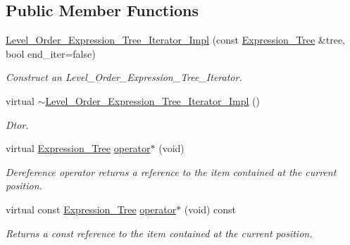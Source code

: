\subsection*{Public Member Functions}
\begin{DoxyCompactItemize}
\item 
\hyperlink{classMadara_1_1Expression__Tree_1_1Level__Order__Expression__Tree__Iterator__Impl_a42963da6e9ee434182a2fe95cf3c7f08}{Level\_\-Order\_\-Expression\_\-Tree\_\-Iterator\_\-Impl} (const \hyperlink{classMadara_1_1Expression__Tree_1_1Expression__Tree}{Expression\_\-Tree} \&tree, bool end\_\-iter=false)
\begin{DoxyCompactList}\small\item\em Construct an Level\_\-Order\_\-Expression\_\-Tree\_\-Iterator. \item\end{DoxyCompactList}\item 
virtual \hyperlink{classMadara_1_1Expression__Tree_1_1Level__Order__Expression__Tree__Iterator__Impl_a38fcd1af02cd6d5938ff2068039086af}{$\sim$Level\_\-Order\_\-Expression\_\-Tree\_\-Iterator\_\-Impl} ()
\begin{DoxyCompactList}\small\item\em Dtor. \item\end{DoxyCompactList}\item 
virtual \hyperlink{classMadara_1_1Expression__Tree_1_1Expression__Tree}{Expression\_\-Tree} \hyperlink{classMadara_1_1Expression__Tree_1_1Level__Order__Expression__Tree__Iterator__Impl_a460b8a8a32917a1e1b92cc15ec2d73e6}{operator$\ast$} (void)
\begin{DoxyCompactList}\small\item\em Dereference operator returns a reference to the item contained at the current position. \item\end{DoxyCompactList}\item 
virtual const \hyperlink{classMadara_1_1Expression__Tree_1_1Expression__Tree}{Expression\_\-Tree} \hyperlink{classMadara_1_1Expression__Tree_1_1Level__Order__Expression__Tree__Iterator__Impl_a0574f9e59888cd7c6ed2f7d1c9c322ce}{operator$\ast$} (void) const 
\begin{DoxyCompactList}\small\item\em Returns a const reference to the item contained at the current position. \item\end{DoxyCompactList}\item 

\end{DoxyCompactItemize}
